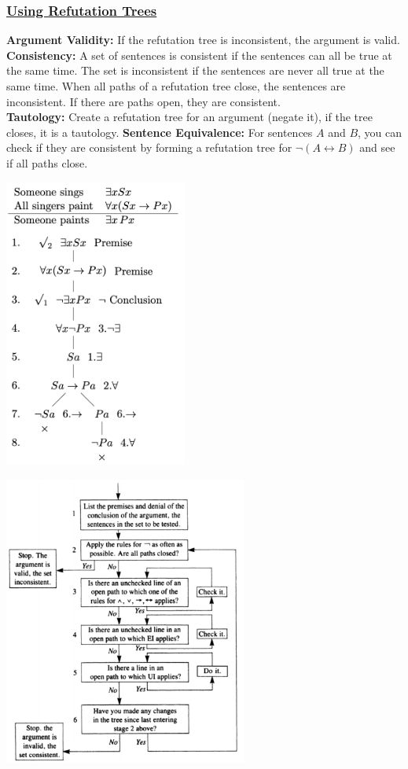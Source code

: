 \documentclass[12pt]{article}
\begin{document}
\subsubsection*{\underline{Using Refutation Trees}}
\textbf{Argument Validity:} If the refutation tree is inconsistent, the argument is valid. \\
\textbf{Consistency:} A set of sentences is consistent if the sentences can all be true at the same time.  The set is inconsistent if the sentences are never all true at the same time. When all paths of a refutation tree close, the sentences are inconsistent. If there are paths open, they are consistent. \\
\textbf{Tautology:} Create a refutation tree for an argument (negate it), if the tree closes, it is a tautology.
\textbf{Sentence Equivalence:} For sentences $A$ and $B$, you can check if they are consistent by forming a refutation tree for $\neg(A \leftrightarrow B)$ and see if all paths close.
\begin{multicols}{2}
  \includegraphics[width=6cm]{reftree.png}\par
  \includegraphics[width=8cm]{flow.png}\par
\end{multicols}
\end{document}
